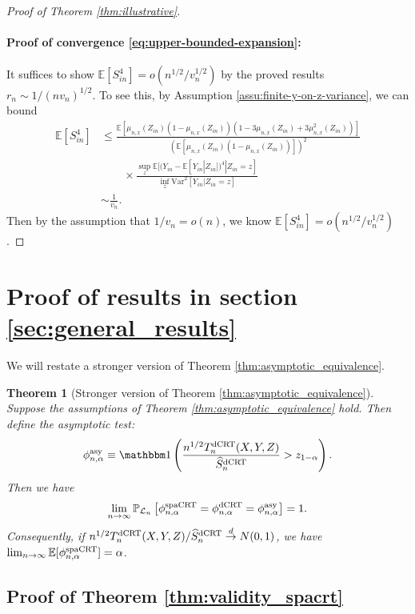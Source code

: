 \documentclass[12pt]{article}
\newtheorem{theorem}{Theorem}
\theoremstyle{definition}
\def\P{\mathbb{P}}
\def\P{\mathbb{P}}
\newcommand{\E}{\mathbb E}								%
\renewcommand{\P}{\mathbb{P}}							%
\newcommand{\indicator}{\mathbbm 1}						%
\newcommand{\convd}{\overset d \rightarrow}             %
\newcommand{\srx}{X}									%
\newcommand{\srz}{Z}									%
\newcommand{\sry}{Y}									%
\newcommand{\law}{\mathcal L}							%
\newcommand{\dCRT}{\textnormal{dCRT}} 					%
\newcommand{\spacrt}{\textnormal{spaCRT}}               %
\newcommand{\asy}{\textnormal{asy}}              %
\begin{document}
\begin{proof}[Proof of Theorem \ref{thm:illustrative}]
  \paragraph{Proof of convergence \eqref{eq:upper-bounded-expansion}:}
  It suffices to show $\E[S_{in}^4]=o(n^{1/2}/v_n^{1/2})$ by the proved results $r_n\sim 1/(nv_n)^{1/2}$. To see this, by Assumption \ref{assu:finite-y-on-z-variance}, we can bound 
  \begin{align*}
	\E[S_{in}^4]
	&
	\leq \frac{\E[\mu_{n,x}(\srz_{in})(1-\mu_{n,x}(\srz_{in}))(1-3\mu_{n,x}(\srz_{in})+3\mu_{n,x}^2(\srz_{in}))]}{(\E[\mu_{n,x}(\srz_{in})(1-\mu_{n,x}(\srz_{in}))])^{2}}\\
	&
	\qquad
	\times \frac{\sup_z\E[(\sry_{in}-\E[\sry_{in}|\srz_{in}])^4|\srz_{in}=z]}{\inf_{z}\mathrm{Var}^2[\sry_{in}|\srz_{in}=z]}\\
	&
	\sim \frac{1}{v_n}.
  \end{align*}
  Then by the assumption that $1/v_n=o(n)$, we know $\E[S_{in}^4]=o(n^{1/2}/v_n^{1/2})$.
\end{proof}


\section{Proof of results in section \ref{sec:general_results}}

We will restate a stronger version of Theorem \ref{thm:asymptotic_equivalence}.
\begin{theorem}[Stronger version of Theorem \ref{thm:asymptotic_equivalence}]\label{thm:asymptotic_equivalence_stronger}
  Suppose the assumptions of Theorem \ref{thm:asymptotic_equivalence} hold. Then define the asymptotic test:
  \begin{align}\label{eq:asy_test}
    \phi_{n,\alpha}^{\asy}\equiv \indicator\left(\frac{n^{1/2}T_n^{\dCRT}(\srx,\sry,\srz)}{\widehat{S}_n^{\dCRT}}>z_{1-\alpha}\right).
  \end{align}
  Then we have
  \begin{align*}
    \lim_{n\rightarrow\infty}\P_{\law_n}\left[\phi_{n,\alpha}^{\spacrt}=\phi_{n,\alpha}^{\dCRT}=\phi_{n,\alpha}^{\asy}\right]=1.
  \end{align*}
  Consequently, if $n^{1/2}T_n^{\dCRT}(\srx,\sry,\srz)/\widehat{S}_n^{\dCRT}\convd N(0,1)$, we have $ \lim_{n\rightarrow\infty}\E[\phi_{n,\alpha}^{\spacrt}]=\alpha$.
\end{theorem}

\subsection{Proof of Theorem \ref{thm:validity_spacrt}}
\end{document}
